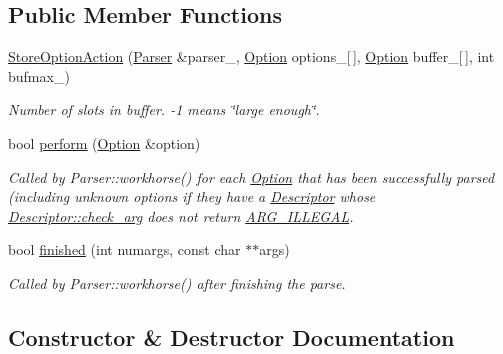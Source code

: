 \subsection*{Public Member Functions}
\begin{DoxyCompactItemize}
\item 
\hyperlink{classoption_1_1_parser_1_1_store_option_action_aaa638cdd712202e3e10471d4299f7f9d}{Store\+Option\+Action} (\hyperlink{classoption_1_1_parser}{Parser} \&parser\+\_\+, \hyperlink{classoption_1_1_option}{Option} options\+\_\+\mbox{[}$\,$\mbox{]}, \hyperlink{classoption_1_1_option}{Option} buffer\+\_\+\mbox{[}$\,$\mbox{]}, int bufmax\+\_\+)
\begin{DoxyCompactList}\small\item\em Number of slots in {\ttfamily buffer}. {\ttfamily -\/1} means \char`\"{}large enough\char`\"{}. \end{DoxyCompactList}\item 
bool \hyperlink{classoption_1_1_parser_1_1_store_option_action_a8931919fba5516377c202920db2b2f84}{perform} (\hyperlink{classoption_1_1_option}{Option} \&option)
\begin{DoxyCompactList}\small\item\em Called by Parser\+::workhorse() for each \hyperlink{classoption_1_1_option}{Option} that has been successfully parsed (including unknown options if they have a \hyperlink{structoption_1_1_descriptor}{Descriptor} whose \hyperlink{structoption_1_1_descriptor_aa5d675dba0214a4abd73007ff163cc67}{Descriptor\+::check\+\_\+arg} does not return \hyperlink{namespaceoption_aee8c76a07877335762631491e7a5a1a9a9528e32563b795bd2930b12d0a5e382d}{A\+R\+G\+\_\+\+I\+L\+L\+E\+G\+AL}. \end{DoxyCompactList}\item 
bool \hyperlink{classoption_1_1_parser_1_1_store_option_action_a617f675ef50a72ae36ce91f065bc8441}{finished} (int numargs, const char $\ast$$\ast$args)
\begin{DoxyCompactList}\small\item\em Called by Parser\+::workhorse() after finishing the parse. \end{DoxyCompactList}\end{DoxyCompactItemize}


\subsection{Constructor \& Destructor Documentation}
\mbox{\label{classoption_1_1_parser_1_1_store_option_action_aaa638cdd712202e3e10471d4299f7f9d}} 
